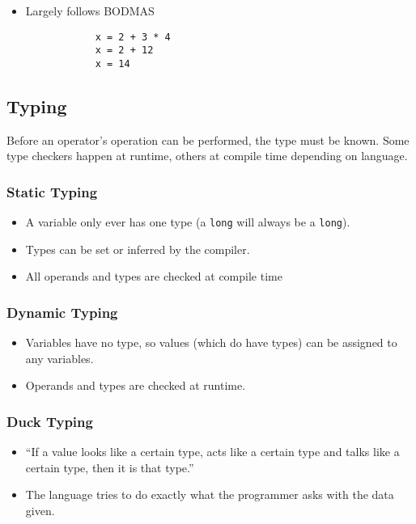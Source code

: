 \begin{itemize}
    \item Largely follows BODMAS
        \begin{verbatim}
            x = 2 + 3 * 4
            x = 2 + 12
            x = 14
        \end{verbatim}
\end{itemize}

\subsection{Typing}\label{sub:typing}

Before an operator's operation can be performed, the type must be known.
Some type checkers happen at runtime, others at compile time depending on language.

\subsubsection{Static Typing}\label{ssub:static-typing}

\begin{itemize}
    \item A variable only ever has one type (a \texttt{long} will always be a \texttt{long}).
    \item Types can be set or inferred by the compiler.
    \item All operands and types are checked at compile time
\end{itemize}

\subsubsection{Dynamic Typing}\label{ssub:dynamic-typing}

\begin{itemize}
    \item Variables have no type, so values (which do have types) can be assigned to any variables.
    \item Operands and types are checked at runtime.
\end{itemize}

\subsubsection{Duck Typing}\label{ssub:duck-typing}

\begin{itemize}
    \item ``If a value looks like a certain type, acts like a certain type and talks like a certain type, then it is that type.''
    \item The language tries to do exactly what the programmer asks with the data given.
\end{itemize}

